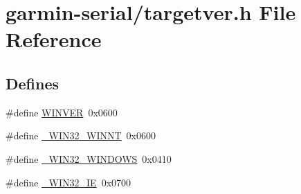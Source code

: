 \hypertarget{garmin-serial_2targetver_8h}{
\section{garmin-\/serial/targetver.h File Reference}
\label{garmin-serial_2targetver_8h}
}
\subsection*{Defines}
\begin{DoxyCompactItemize}
\item 
\#define \hyperlink{garmin-serial_2targetver_8h_a966cd377b9f3fdeb1432460c33352af1}{WINVER}~0x0600
\item 
\#define \hyperlink{garmin-serial_2targetver_8h_ac50762666aa00bd3a4308158510f1748}{\_\-WIN32\_\-WINNT}~0x0600
\item 
\#define \hyperlink{garmin-serial_2targetver_8h_a074ca98c073d899c62fc6629918186c8}{\_\-WIN32\_\-WINDOWS}~0x0410
\item 
\#define \hyperlink{garmin-serial_2targetver_8h_ad4562ce705fe4682e63dc8f1ea9dd344}{\_\-WIN32\_\-IE}~0x0700
\end{DoxyCompactItemize}


